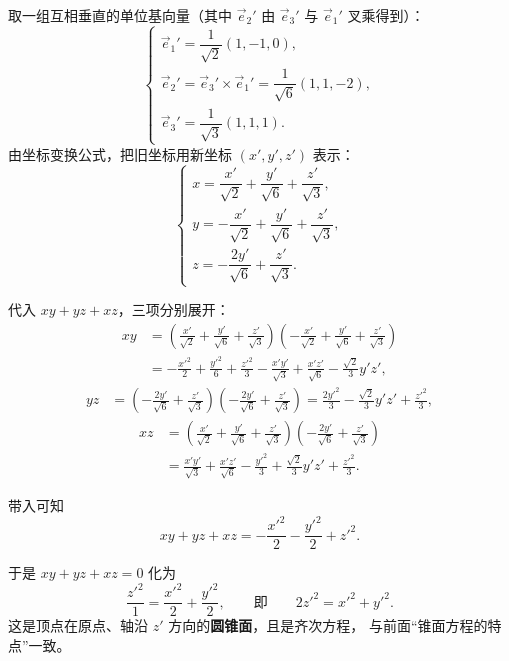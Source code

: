 \documentclass[UTF8,11pt]{ctexart}
\theoremstyle{cnthm}
\begin{document}
取一组互相垂直的单位基向量（其中 $\vec e_2'$ 由 $\vec e_3'$ 与
$\vec e_1'$ 叉乘得到）：
\[
\begin{cases}
\vec e_1'=\dfrac{1}{\sqrt2}(1,-1,0),\\[8pt]
\vec e_2'=\vec e_3'\times\vec e_1'=\dfrac{1}{\sqrt6}(1,1,-2),\\[8pt]
\vec e_3'=\dfrac{1}{\sqrt3}(1,1,1).
\end{cases}
\]
由坐标变换公式，把旧坐标用新坐标 $(x',y',z')$ 表示：
\[
\begin{cases}
x=\dfrac{x'}{\sqrt2}+\dfrac{y'}{\sqrt6}+\dfrac{z'}{\sqrt3},\\[8pt]
y=-\dfrac{x'}{\sqrt2}+\dfrac{y'}{\sqrt6}+\dfrac{z'}{\sqrt3},\\[8pt]
z=-\dfrac{2y'}{\sqrt6}+\dfrac{z'}{\sqrt3}.
\end{cases}
\]

代入 $xy+yz+xz$，三项分别展开：
\[
\begin{aligned}
xy&=\left(\frac{x'}{\sqrt2}+\frac{y'}{\sqrt6}+\frac{z'}{\sqrt3}\right)
\left(-\frac{x'}{\sqrt2}+\frac{y'}{\sqrt6}+\frac{z'}{\sqrt3}\right)\\
&=-\frac{x'^2}{2}+\frac{y'^2}{6}+\frac{z'^2}{3}
-\frac{x'y'}{\sqrt3}+\frac{x'z'}{\sqrt6}-\frac{\sqrt2}{3}y'z',
\end{aligned}
\]
\[
\begin{aligned}
yz&=\left(-\frac{2y'}{\sqrt6}+\frac{z'}{\sqrt3}\right)
\left(-\frac{2y'}{\sqrt6}+\frac{z'}{\sqrt3}\right)
=\frac{2y'^2}{3}-\frac{\sqrt2}{3}y'z'+\frac{z'^2}{3},
\end{aligned}
\]
\[
\begin{aligned}
xz&=\left(\frac{x'}{\sqrt2}+\frac{y'}{\sqrt6}+\frac{z'}{\sqrt3}\right)
\left(-\frac{2y'}{\sqrt6}+\frac{z'}{\sqrt3}\right)\\
&=\frac{x'y'}{\sqrt3}+\frac{x'z'}{\sqrt6}-\frac{y'^2}{3}+\frac{\sqrt2}{3}y'z'+\frac{z'^2}{3}.
\end{aligned}
\]

带入可知
\[
xy+yz+xz=-\frac{x'^2}{2}-\frac{y'^2}{2}+z'^2 .
\]

于是 $xy+yz+xz=0$ 化为
\[
\frac{z'^2}{1}=\frac{x'^2}{2}+\frac{y'^2}{2},
\qquad\text{即}\qquad
2z'^2=x'^2+y'^2 .
\]
这是顶点在原点、轴沿 $z'$ 方向的\textbf{圆锥面}，且是齐次方程，
与前面“锥面方程的特点”一致。
\end{document}
